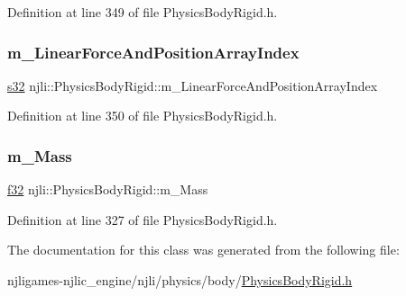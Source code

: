 Definition at line 349 of file Physics\+Body\+Rigid.\+h.

\mbox{\label{classnjli_1_1_physics_body_rigid_ab2c6509114dbd98b54082105ed189c12}} 
\subsubsection{\texorpdfstring{m\+\_\+\+Linear\+Force\+And\+Position\+Array\+Index}{m\_LinearForceAndPositionArrayIndex}}
{\footnotesize\ttfamily \mbox{\hyperlink{_util_8h_aa62c75d314a0d1f37f79c4b73b2292e2}{s32}} njli\+::\+Physics\+Body\+Rigid\+::m\+\_\+\+Linear\+Force\+And\+Position\+Array\+Index\hspace{0.3cm}{\ttfamily [private]}}



Definition at line 350 of file Physics\+Body\+Rigid.\+h.

\mbox{\label{classnjli_1_1_physics_body_rigid_ac62838462af7ad59f3763646a3062496}} 
\subsubsection{\texorpdfstring{m\+\_\+\+Mass}{m\_Mass}}
{\footnotesize\ttfamily \mbox{\hyperlink{_util_8h_a5f6906312a689f27d70e9d086649d3fd}{f32}} njli\+::\+Physics\+Body\+Rigid\+::m\+\_\+\+Mass\hspace{0.3cm}{\ttfamily [private]}}



Definition at line 327 of file Physics\+Body\+Rigid.\+h.



The documentation for this class was generated from the following file\+:\begin{DoxyCompactItemize}
\item 
njligames-\/njlic\+\_\+engine/njli/physics/body/\mbox{\hyperlink{_physics_body_rigid_8h}{Physics\+Body\+Rigid.\+h}}\end{DoxyCompactItemize}
